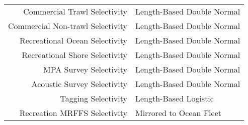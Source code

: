 \begin{longtable}[t]{r>{\centering\arraybackslash}p{6cm}}
Commercial Trawl Selectivity & Length-Based Double Normal\\
Commercial Non-trawl Selectivity & Length-Based Double Normal\\
Recreational Ocean Selectivity & Length-Based Double Normal\\
Recreational Shore Selectivity & Length-Based Double Normal\\
MPA Survey Selectivity & Length-Based Double Normal\\
Acoustic Survey Selectivity & Length-Based Double Normal\\
Tagging Selectivity & Length-Based Logistic\\
Recreation MRFFS Selectivity & Mirrored to Ocean Fleet\\*
  \end{longtable}
\endgroup{}
